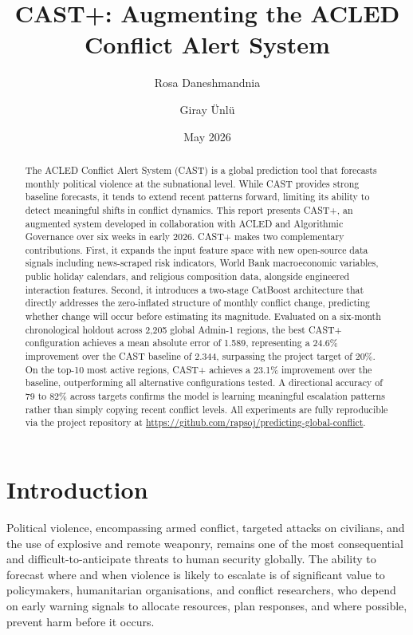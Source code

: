 \documentclass[12pt,a4paper]{article}
\title{\textbf{CAST+: Augmenting the ACLED Conflict Alert System }}
\author{Rosa Daneshmandnia \and Giray \"{U}nl\"{u}}
\date{May 2026}
\begin{document}
\maketitle

\begin{abstract}
The ACLED Conflict Alert System (CAST) is a global prediction tool that
forecasts monthly political violence at the subnational level. While
CAST provides strong baseline forecasts, it tends to extend recent
patterns forward, limiting its ability to detect meaningful shifts in
conflict dynamics. This report presents CAST+, an augmented system
developed in collaboration with ACLED and Algorithmic Governance over
six weeks in early 2026. CAST+ makes two complementary contributions.
First, it expands the input feature space with new open-source data
signals including news-scraped risk indicators, World Bank macroeconomic
variables, public holiday calendars, and religious composition data,
alongside engineered interaction features. Second, it introduces a
two-stage CatBoost architecture that directly addresses the zero-inflated
structure of monthly conflict change, predicting whether change will
occur before estimating its magnitude. Evaluated on a six-month
chronological holdout across 2,205 global Admin-1 regions, the best
CAST+ configuration achieves a mean absolute error of 1.589, representing
a 24.6\% improvement over the CAST baseline of 2.344, surpassing the
project target of 20\%. On the top-10 most active regions, CAST+ achieves
a 23.1\% improvement over the baseline, outperforming all alternative
configurations tested. A directional accuracy of 79 to 82\% across
targets confirms the model is learning meaningful escalation patterns
rather than simply copying recent conflict levels. All experiments are
fully reproducible via the project repository at
\url{https://github.com/rapsoj/predicting-global-conflict}.
\end{abstract}

\tableofcontents
\newpage

\section{Introduction}

Political violence, encompassing armed conflict, targeted attacks on
civilians, and the use of explosive and remote weaponry, remains one
of the most consequential and difficult-to-anticipate threats to human
security globally. The ability to forecast where and when violence is
likely to escalate is of significant value to policymakers, humanitarian
organisations, and conflict researchers, who depend on early warning
signals to allocate resources, plan responses, and where possible,
prevent harm before it occurs.
\end{document}
